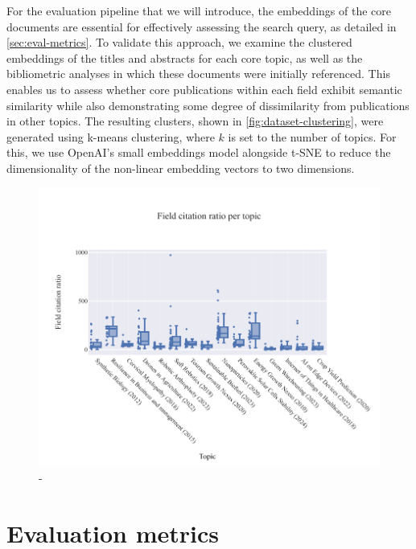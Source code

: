 For the evaluation pipeline that we will introduce, the embeddings of the core documents are essential for effectively assessing the search query, as detailed in \autoref{sec:eval-metrics}. To validate this approach, we examine the clustered embeddings of the titles and abstracts for each core topic, as well as the bibliometric analyses in which these documents were initially referenced. This enables us to assess whether core publications within each field exhibit semantic similarity while also demonstrating some degree of dissimilarity from publications in other topics. The resulting clusters, shown in \autoref{fig:dataset-clustering}, were generated using k-means clustering, where $k$ is set to the number of topics. For this, we use OpenAI's small embeddings model alongside t-SNE\autocite{van2008visualizing} to reduce the dimensionality of the non-linear embedding vectors to two dimensions.


\begin{figure}
	\centering	
	\includegraphics{pics/citation-distribution.pdf}
	\caption[-]{-}
	\label{fig:dataset-clustering}
\end{figure}

 
\section{Evaluation metrics}\label{sec:eval-metrics}
\lipsum[1-3]
